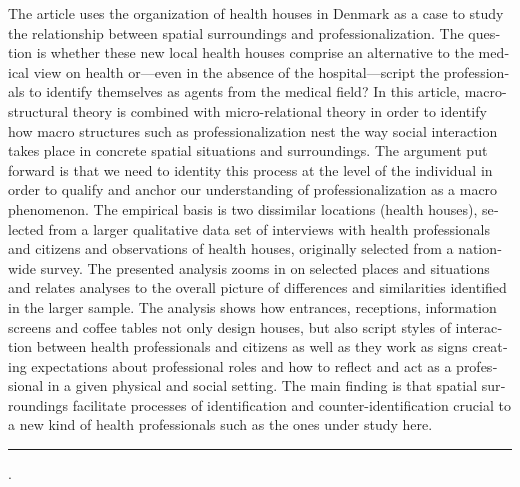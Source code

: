     \begin{adjustwidth}{20mm}{20mm}
\label{paper3:abstract}
    \bigskip
    \begin{otherlanguage}{english}
    {\small

\noindent The article uses the organization of health houses in Denmark as a case to study the relationship between spatial surroundings and professionalization. The question is whether these new local health houses comprise an alternative to the medical view on health or---even in the absence of the hospital---script the professionals to identify themselves as agents from the medical field? In this article, macro-structural theory is combined with micro-relational theory in order to identify how macro structures such as professionalization nest the way social interaction takes place in concrete spatial situations and surroundings. The argument put forward is that we need to identity this process at the level of the individual in order to qualify and anchor our understanding of professionalization as a macro phenomenon. The empirical basis is two dissimilar locations (health houses), selected from a larger qualitative data set of interviews with health professionals and citizens and observations of health houses, originally selected from a nationwide survey. The presented analysis zooms in on selected places and situations and relates analyses to the overall picture of differences and similarities identified in the larger sample. The analysis shows how entrances, receptions, information screens and coffee tables not only design houses, but also script styles of interaction between health professionals and citizens as well as they work as signs creating expectations about professional roles and how to reflect and act as a professional in a given physical and social setting. The main finding is that spatial surroundings facilitate processes of identification and counter-identification crucial to a new kind of health professionals such as the ones under study here.

\smallskip
\noindent\rule{\linewidth}{1pt}

%
\hspace*{0.75em}{%
healthcare professionalism;
spatial surroundings;
counter-identification;
health house service;
vignettes}.

    } %


    \end{otherlanguage}

    \end{adjustwidth}